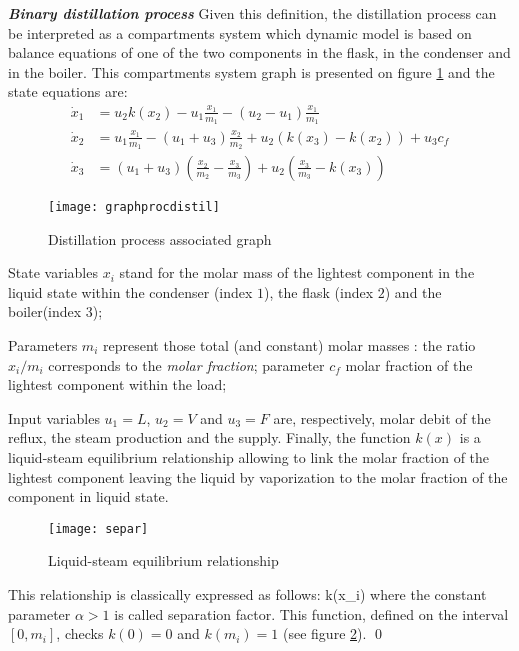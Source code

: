 \begin{exemple}{\bf \em Binary distillation process}
Given this definition, the distillation process can be interpreted as a compartments system which dynamic model is based on
balance equations of one of the two components in the flask, in the condenser and in the boiler.
This compartments system graph is presented on figure \ref{Fig:graphdisti} and the state equations are:
\begin{equation*} \begin{split}
\dot x_1 &= u_2 k(x_2) - u_{1}\frac{x_1}{m_1} - (u_2 - u_1) \frac{x_1}{m_1}\\
\dot x_2 &= u_1\frac{x_1}{m_1} - (u_1+u_3)\frac{x_2}{m_2} + u_2(k(x_3) - k(x_2)) + u_3c_f\\
\dot x_3 &= (u_1 + u_3)(\frac{x_2}{m_2} - \frac{x_3}{m_3}) + u_2(\frac{x_3}{m_3} - k(x_3))
\end{split} \end{equation*}
\begin{figure}[h]
\begin{center}
\texttt{[image: graphprocdistil]}
\caption{Distillation process associated graph}
\label{Fig:graphdisti}
\end{center} 
\end{figure}
State variables $x_i$ stand for the molar mass of the lightest component in the liquid state within
the condenser (index $1$), the flask (index $2$) and the boiler(index  $3$);

Parameters $m_i$ represent those total (and constant) molar masses : 
the ratio $x_i/m_i$ corresponds to the {\it molar fraction}; 
parameter $c_f$ molar fraction of the lightest component within the load; 

Input variables $u_1 = L$, $u_2 = V$ and $u_3 = F$ are, respectively, molar debit of the reflux, the steam production and the supply.
Finally, the function $k(x)$ is a liquid-steam equilibrium relationship allowing to link the molar fraction of the lightest component
leaving the liquid by vaporization to the molar fraction of the component in liquid state. 
\begin{figure}[ht]
\begin{center}
\texttt{[image: separ]}
\caption{Liquid-steam equilibrium relationship}
\label{Fig:separ}
\end{center} 
\end{figure}

\noindent This relationship is classically expressed as follows:
\eqnn
k(x_i) \triangleq {}
\eeqnn
where the constant parameter $\alpha > 1$ is called separation factor.
This function, defined on the interval $[0,m_i]$, checks $k(0) = 0$ and
$k(m_i) = 1$ (see figure \ref{Fig:separ}). \qed  
\end{exemple}

